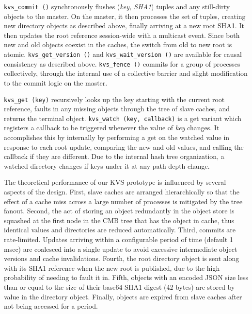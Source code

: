 {\tt kvs\_commit ()} synchronously flushes ({\em key, SHA1}) tuples
and any still-dirty objects to the master.  On the master, it then
processes the set of tuples, creating new directory objects as described
above, finally arriving at a new root SHA1.  It then updates the 
root reference session-wide with a multicast event.
Since both new and old objects coexist in the caches, the switch from old
to new root is atomic.
{\tt kvs\_get\_version ()} and {\tt kvs\_wait\_version ()} are available
for causal consistency as described above.
{\tt kvs\_fence ()} commits for a group of processes collectively,
through the internal use of a collective barrier
and slight modification to the commit logic on the master.

{\tt kvs\_get (key)} recursively looks up the key starting with the
current root reference, faults in any missing objects
through the tree of slave caches, and returns the terminal object.
{\tt kvs\_watch (key, callback)} is a get variant which registers a
callback to be triggered whenever the value of {\em key} changes.
It accomplishes this by internally by performing a get on the watched
value in response to each root update, comparing the new
and old values, and calling the callback if they are different.
Due to the internal hash tree organization, a watched directory changes
if keys under it at any path depth change.

The theoretical performance of our KVS prototype is influenced by
several aspects of the design. First,  
slave caches are arranged hierarchically so that the effect of a
cache miss across a large number of processes is mitigated by the tree
fanout. Second, the act of storing an object redundantly in the object store
is squashed at the first node in the CMB tree that has the object
in cache, thus identical values and directories are reduced automatically.
Third, commits are rate-limited.  Updates arriving within a configurable
period of time (default 1 msec) are coalesced into a single update to
avoid excessive intermediate object versions and cache invalidations.
Fourth, the root directory object is sent along with its SHA1 reference when the
new root is published, due to the high probability of needing to fault it in.
Fifth, objects with an encoded JSON size less than or equal to the size
of their base64 SHA1 digest (42 bytes) are stored by value in the directory
object. Finally, objects are expired from slave caches after not being accessed for
a period. %

%
